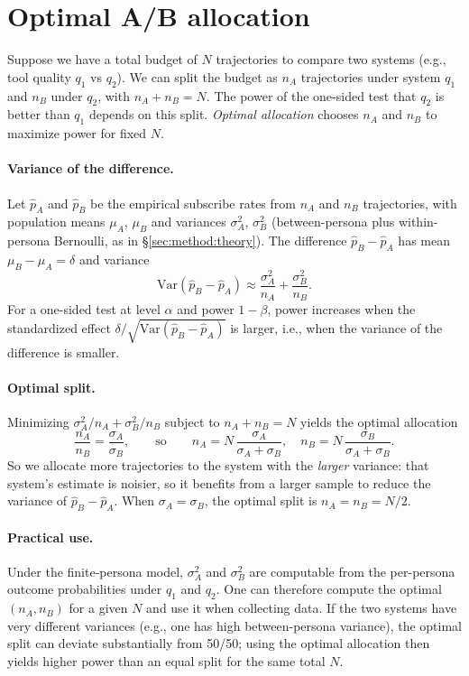 \section{Optimal A/B allocation}
\label{sec:optimal-ab}

Suppose we have a total budget of $N$ trajectories to compare two systems (e.g., tool quality $q_1$ vs $q_2$). We can split the budget as $n_A$ trajectories under system $q_1$ and $n_B$ under $q_2$, with $n_A + n_B = N$. The power of the one-sided test that $q_2$ is better than $q_1$ depends on this split. \emph{Optimal allocation} chooses $n_A$ and $n_B$ to maximize power for fixed $N$.

\paragraph{Variance of the difference.}
Let $\widehat{p}_A$ and $\widehat{p}_B$ be the empirical subscribe rates from $n_A$ and $n_B$ trajectories, with population means $\mu_A$, $\mu_B$ and variances $\sigma_A^2$, $\sigma_B^2$ (between-persona plus within-persona Bernoulli, as in \S\ref{sec:method:theory}). The difference $\widehat{p}_B - \widehat{p}_A$ has mean $\mu_B - \mu_A = \delta$ and variance
\begin{equation}
  \mathrm{Var}(\widehat{p}_B - \widehat{p}_A) \approx \frac{\sigma_A^2}{n_A} + \frac{\sigma_B^2}{n_B}.
\end{equation}
For a one-sided test at level $\alpha$ and power $1 - \beta$, power increases when the standardized effect $\delta / \sqrt{\mathrm{Var}(\widehat{p}_B - \widehat{p}_A)}$ is larger, i.e., when the variance of the difference is smaller.

\paragraph{Optimal split.}
Minimizing $\sigma_A^2/n_A + \sigma_B^2/n_B$ subject to $n_A + n_B = N$ yields the optimal allocation
\begin{equation}
  \frac{n_A}{n_B} = \frac{\sigma_A}{\sigma_B}, \qquad \text{so} \qquad n_A = N\, \frac{\sigma_A}{\sigma_A + \sigma_B}, \quad n_B = N\, \frac{\sigma_B}{\sigma_A + \sigma_B}. \label{eq:optimal-split}
\end{equation}
So we allocate more trajectories to the system with the \emph{larger} variance: that system's estimate is noisier, so it benefits from a larger sample to reduce the variance of $\widehat{p}_B - \widehat{p}_A$. When $\sigma_A = \sigma_B$, the optimal split is $n_A = n_B = N/2$.

\paragraph{Practical use.}
Under the finite-persona model, $\sigma_A^2$ and $\sigma_B^2$ are computable from the per-persona outcome probabilities under $q_1$ and $q_2$. One can therefore compute the optimal $(n_A, n_B)$ for a given $N$ and use it when collecting data. If the two systems have very different variances (e.g., one has high between-persona variance), the optimal split can deviate substantially from 50/50; using the optimal allocation then yields higher power than an equal split for the same total $N$.
